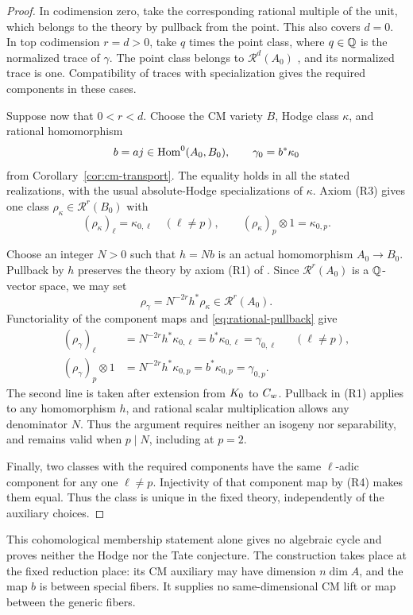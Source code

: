\begin{proof}
In codimension zero, take the corresponding rational multiple of the
unit, which belongs to the theory by pullback from the point.  This
also covers $d=0$.  In top codimension $r=d>0$, take $q$ times the
point class, where $q\in\mathbb Q$ is the normalized trace of $\gamma$.
The point class belongs to $\mathcal R^d(A_0)$
\cite[\S2.3]{Milne2009}, and its normalized trace is one.  Compatibility
of traces with specialization gives the required components in these
cases.

Suppose now that $0<r<d$.  Choose the CM variety $B$, Hodge class
$\kappa$, and rational homomorphism
\[
 b=aj\in\operatorname{Hom}^0(A_0,B_0),\qquad
 \gamma_0=b^*\kappa_0
\]
from Corollary~\ref{cor:cm-transport}.  The equality holds in all
the stated realizations, with the usual absolute-Hodge specializations
of $\kappa$.  Axiom \textup{(R3)} gives one class
\(\rho_\kappa\in\mathcal R^r(B_0)\) with
\[
 (\rho_\kappa)_\ell=\kappa_{0,\ell}\quad(\ell\ne p),\qquad
 (\rho_\kappa)_p\otimes1=\kappa_{0,p}.
\]

Choose an integer \(N>0\) such that \(h=Nb\) is an actual
homomorphism \(A_0\to B_0\). Pullback by \(h\) preserves the theory
by axiom \textup{(R1)} of \cite[Definition~2.1]{Milne2009}. Since
\(\mathcal R^r(A_0)\) is a \(\mathbb Q\)-vector space, we may set
\[
 \rho_\gamma=N^{-2r}h^*\rho_\kappa\in\mathcal R^r(A_0).
\]
Functoriality of the component maps and
\eqref{eq:rational-pullback} give
\begin{align*}
 (\rho_\gamma)_\ell
   &=N^{-2r}h^*\kappa_{0,\ell}
     =b^*\kappa_{0,\ell}=\gamma_{0,\ell}
       &&(\ell\ne p),\\
 (\rho_\gamma)_p\otimes1
   &=N^{-2r}h^*\kappa_{0,p}
     =b^*\kappa_{0,p}=\gamma_{0,p}.
\end{align*}
The second line is taken after extension from $K_0$ to $C_w$.
Pullback in \textup{(R1)} applies to any homomorphism $h$, and rational
scalar multiplication allows any denominator $N$.  Thus the argument
requires neither an isogeny nor separability, and remains valid when
$p\mid N$, including at $p=2$.

Finally, two classes with the required components have the same
\(\ell\)-adic component for any one \(\ell\ne p\). Injectivity of
that component map by \textup{(R4)} makes them equal. Thus the class
is unique in the fixed theory, independently of the auxiliary choices.
\end{proof}

This cohomological membership statement alone gives no algebraic cycle
and proves neither the Hodge nor the Tate conjecture.  The construction
takes place at the fixed
reduction place: its CM auxiliary may have dimension $n\dim A$, and
the map $b$ is between special fibers.  It supplies no same-dimensional
CM lift or map between the generic fibers.

